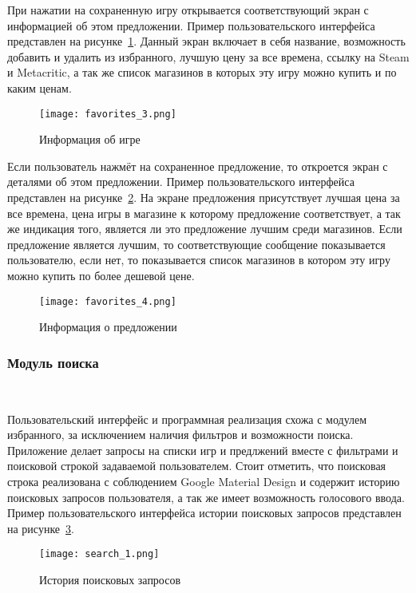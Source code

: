 При нажатии на сохраненную игру открывается соответствующий экран с информацией об этом предложении. Пример пользовательского интерфейса представлен на рисунке~\ref{fig:arch:favorites_3}. Данный экран включает в себя название, возможность добавить и удалить из избранного, лучшую цену за все времена, ссылку на Steam и Metacritic, а так же список магазинов в которых эту игру можно купить и по каким ценам.

\begin{figure}[H]
 \centering
   \texttt{[image: favorites\_3.png]} 
   \caption{Информация об игре}
   \label{fig:arch:favorites_3}
\end{figure}

Если пользователь нажмёт на сохраненное предложение, то откроется экран с деталями об этом предложении. Пример пользовательского интерфейса представлен на рисунке~\ref{fig:arch:favorites_4}. На экране предложения присутствует лучшая цена за все времена, цена игры в магазине к которому предложение соответствует, а так же индикация того, является ли это предложение лучшим среди магазинов. Если предложение является лучшим, то соответствующие сообщение показывается пользователю, если нет, то показывается список магазинов в котором эту игру можно купить по более дешевой цене.

\begin{figure}[H]
 \centering
   \texttt{[image: favorites\_4.png]} 
   \caption{Информация о предложении}
   \label{fig:arch:favorites_4}
\end{figure}


\subsubsection{Модуль поиска}~\par
Пользовательский интерфейс и программная реализация схожа с модулем избранного, за исключением наличия фильтров и возможности поиска. Приложение делает запросы на списки игр и предлжений вместе с фильтрами и поисковой строкой задаваемой пользователем. Стоит отметить, что поисковая строка реализована с соблюдением Google Material Design и содержит историю поисковых запросов пользователя, а так же имеет возможность голосового ввода. Пример пользовательского интерфейса истории поисковых запросов представлен на рисунке~\ref{fig:arch:search_1}.

\begin{figure}[H]
 \centering
   \texttt{[image: search\_1.png]} 
   \caption{История поисковых запросов}
   \label{fig:arch:search_1}
\end{figure}

